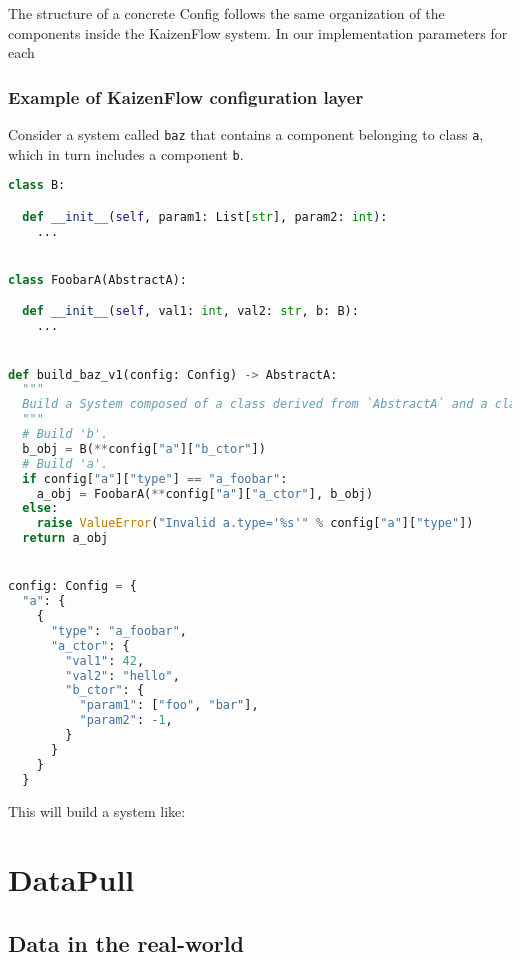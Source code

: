 \documentclass[11pt, reqno]{amsart}
\theoremstyle{definition}
\theoremstyle{remark}
\begin{document}
The structure of a concrete Config follows the same organization of the
components inside the KaizenFlow system.
In our implementation parameters for each

\subsubsection{Example of KaizenFlow configuration layer}
Consider a system called \verb|baz| that contains a component belonging to class
\verb|a|, which in turn includes a component \verb|b|.

\begin{lstlisting}[language=Python, caption=Python example]
class B:

  def __init__(self, param1: List[str], param2: int):
    ...


class FoobarA(AbstractA):

  def __init__(self, val1: int, val2: str, b: B):
    ...


def build_baz_v1(config: Config) -> AbstractA:
  """
  Build a System composed of a class derived from `AbstractA` and a class `B`.
  """
  # Build 'b'.
  b_obj = B(**config["a"]["b_ctor"])
  # Build 'a'.
  if config["a"]["type"] == "a_foobar":
    a_obj = FoobarA(**config["a"]["a_ctor"], b_obj)
  else:
    raise ValueError("Invalid a.type='%s'" % config["a"]["type"])
  return a_obj


config: Config = {
  "a": {
    {
      "type": "a_foobar",
      "a_ctor": {
        "val1": 42,
        "val2": "hello",
        "b_ctor": {
          "param1": ["foo", "bar"],
          "param2": -1,
        }
      }
    }
  }
\end{lstlisting}

This will build a system like:

\section{DataPull}

\subsection{Data in the real-world}

\end{document}
